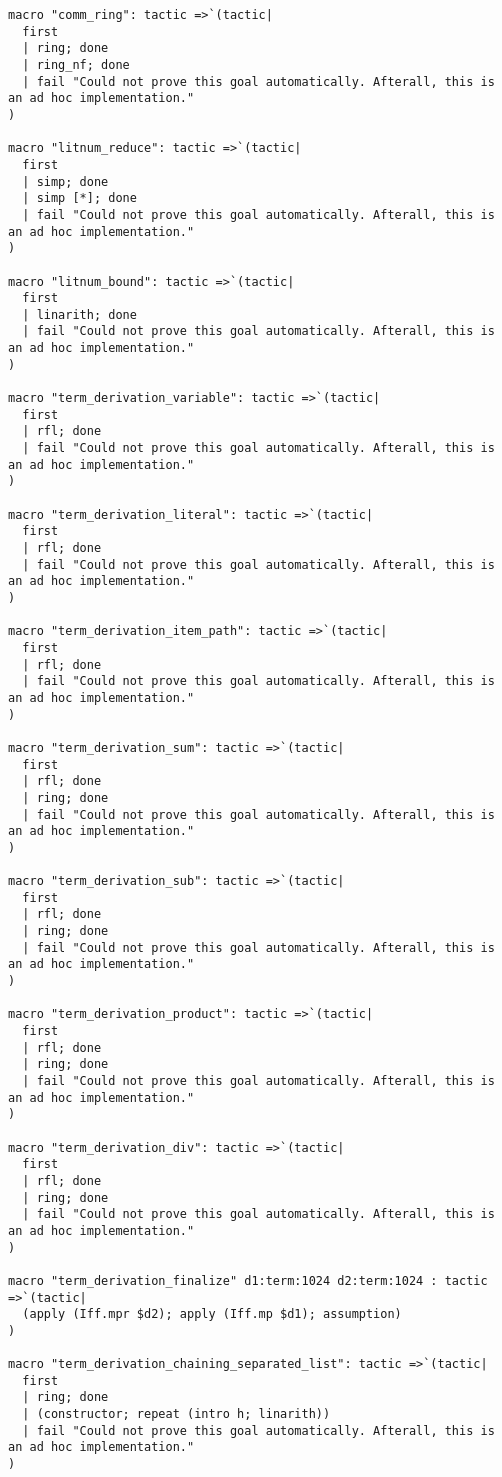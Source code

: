 \documentclass{article}
\begin{document}
\begin{tcolorbox}[colback=white!10, width=\linewidth]
\begin{lstlisting}[language=Lean4]
macro "comm_ring": tactic =>`(tactic|
  first
  | ring; done
  | ring_nf; done
  | fail "Could not prove this goal automatically. Afterall, this is an ad hoc implementation."
)

macro "litnum_reduce": tactic =>`(tactic|
  first
  | simp; done
  | simp [*]; done
  | fail "Could not prove this goal automatically. Afterall, this is an ad hoc implementation."
)

macro "litnum_bound": tactic =>`(tactic|
  first
  | linarith; done
  | fail "Could not prove this goal automatically. Afterall, this is an ad hoc implementation."
)

macro "term_derivation_variable": tactic =>`(tactic|
  first
  | rfl; done
  | fail "Could not prove this goal automatically. Afterall, this is an ad hoc implementation."
)

macro "term_derivation_literal": tactic =>`(tactic|
  first
  | rfl; done
  | fail "Could not prove this goal automatically. Afterall, this is an ad hoc implementation."
)

macro "term_derivation_item_path": tactic =>`(tactic|
  first
  | rfl; done
  | fail "Could not prove this goal automatically. Afterall, this is an ad hoc implementation."
)

macro "term_derivation_sum": tactic =>`(tactic|
  first
  | rfl; done
  | ring; done
  | fail "Could not prove this goal automatically. Afterall, this is an ad hoc implementation."
)

macro "term_derivation_sub": tactic =>`(tactic|
  first
  | rfl; done
  | ring; done
  | fail "Could not prove this goal automatically. Afterall, this is an ad hoc implementation."
)

macro "term_derivation_product": tactic =>`(tactic|
  first
  | rfl; done
  | ring; done
  | fail "Could not prove this goal automatically. Afterall, this is an ad hoc implementation."
)

macro "term_derivation_div": tactic =>`(tactic|
  first
  | rfl; done
  | ring; done
  | fail "Could not prove this goal automatically. Afterall, this is an ad hoc implementation."
)

macro "term_derivation_finalize" d1:term:1024 d2:term:1024 : tactic =>`(tactic|
  (apply (Iff.mpr $d2); apply (Iff.mp $d1); assumption)
)

macro "term_derivation_chaining_separated_list": tactic =>`(tactic|
  first
  | ring; done
  | (constructor; repeat (intro h; linarith))
  | fail "Could not prove this goal automatically. Afterall, this is an ad hoc implementation."
)


\end{lstlisting}
\end{tcolorbox}
\end{document}
